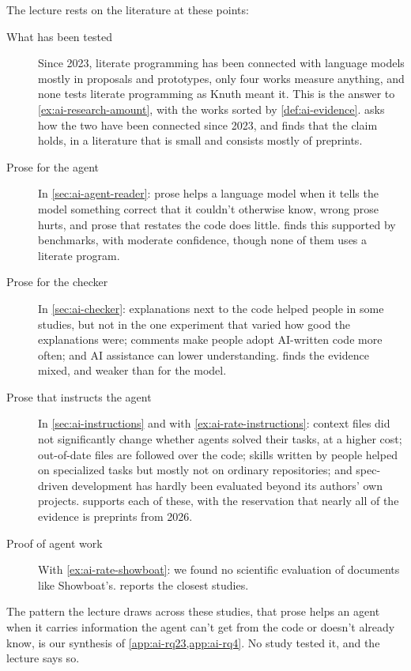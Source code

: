 The lecture rests on the literature at these points:
\begin{description}
  \item[What has been tested] Since 2023, literate programming has been
    connected with language models mostly in proposals and prototypes, only
    four works measure anything, and none tests literate programming as Knuth
    meant it.
    This is the answer to \cref{ex:ai-research-amount}, with the works sorted
    by \cref{def:ai-evidence}.
     asks how the two have been connected since 2023, and
    finds that the claim holds, in a literature that is small and consists
    mostly of preprints.
  \item[Prose for the agent] In \cref{sec:ai-agent-reader}: prose helps a
    language model when it tells the model something correct that it couldn't
    otherwise know, wrong prose hurts, and prose that restates the code does
    little.
     finds this supported by benchmarks, with moderate
    confidence, though none of them uses a literate program.
  \item[Prose for the checker] In \cref{sec:ai-checker}: explanations next to
    the code helped people in some studies, but not in the one experiment that
    varied how good the explanations were; comments make people adopt
    AI-written code more often; and AI assistance can lower understanding.
     finds the evidence mixed, and weaker than for the model.
  \item[Prose that instructs the agent] In \cref{sec:ai-instructions} and with
    \cref{ex:ai-rate-instructions}: context files did not significantly change
    whether agents solved their tasks, at a higher cost; out-of-date files are
    followed over the code; skills written by people helped on specialized
    tasks but mostly not on ordinary repositories; and spec-driven development
    has hardly been evaluated beyond its authors' own projects.
     supports each of these, with the reservation that nearly
    all of the evidence is preprints from 2026.
  \item[Proof of agent work] With \cref{ex:ai-rate-showboat}: we found no
    scientific evaluation of documents like Showboat's.
     reports the closest studies.
\end{description}
The pattern the lecture draws across these studies, that prose helps an agent
when it carries information the agent can't get from the code or doesn't
already know, is our synthesis of \cref{app:ai-rq23,app:ai-rq4}.
No study tested it, and the lecture says so.

